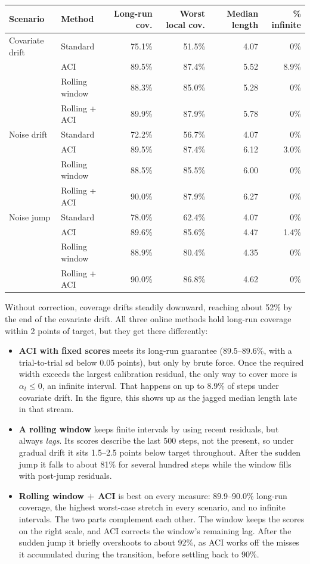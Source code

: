 \documentclass[11pt]{article}
\begin{document}
\begin{center}
\small
\begin{tabular}{ll rrrr}
\toprule
Scenario & Method & Long-run cov. & Worst local cov. & Median length & \% infinite \\
\midrule
Covariate drift & Standard & 75.1\% & 51.5\% & 4.07 & 0\% \\
 & ACI & 89.5\% & 87.4\% & 5.52 & 8.9\% \\
 & Rolling window & 88.3\% & 85.0\% & 5.28 & 0\% \\
 & Rolling + ACI & 89.9\% & 87.9\% & 5.78 & 0\% \\
\midrule
Noise drift & Standard & 72.2\% & 56.7\% & 4.07 & 0\% \\
 & ACI & 89.5\% & 87.4\% & 6.12 & 3.0\% \\
 & Rolling window & 88.5\% & 85.5\% & 6.00 & 0\% \\
 & Rolling + ACI & 90.0\% & 87.9\% & 6.27 & 0\% \\
\midrule
Noise jump & Standard & 78.0\% & 62.4\% & 4.07 & 0\% \\
 & ACI & 89.6\% & 85.6\% & 4.47 & 1.4\% \\
 & Rolling window & 88.9\% & 80.4\% & 4.35 & 0\% \\
 & Rolling + ACI & 90.0\% & 86.8\% & 4.62 & 0\% \\
\bottomrule
\end{tabular}
\end{center}

Without correction, coverage drifts steadily downward, reaching about 52\% by the
end of the covariate drift. All three online methods hold long-run coverage within
2 points of target, but they get there differently:

\begin{itemize}
  \item \textbf{ACI with fixed scores} meets its long-run guarantee (89.5--89.6\%,
    with a trial-to-trial sd below 0.05 points), but only by brute force. Once the
    required width exceeds the largest calibration residual, the only way to cover
    more is $\alpha_t \le 0$, an infinite interval. That happens on up to 8.9\% of
    steps under covariate drift. In the figure, this shows up as the jagged median
    length late in that stream.
  \item \textbf{A rolling window} keeps finite intervals by using recent residuals,
    but always \emph{lags}. Its scores describe the last 500 steps, not the present,
    so under gradual drift it sits 1.5--2.5 points below target throughout. After the
    sudden jump it falls to about 81\% for several hundred steps while the window
    fills with post-jump residuals.
  \item \textbf{Rolling window + ACI} is best on every measure: 89.9--90.0\%
    long-run coverage, the highest worst-case stretch in every scenario, and no
    infinite intervals. The two parts complement each other. The window keeps the
    scores on the right scale, and ACI corrects the window's remaining lag. After the
    sudden jump it briefly overshoots to about 92\%, as ACI works off the misses it
    accumulated during the transition, before settling back to 90\%.
\end{itemize}
\end{document}
